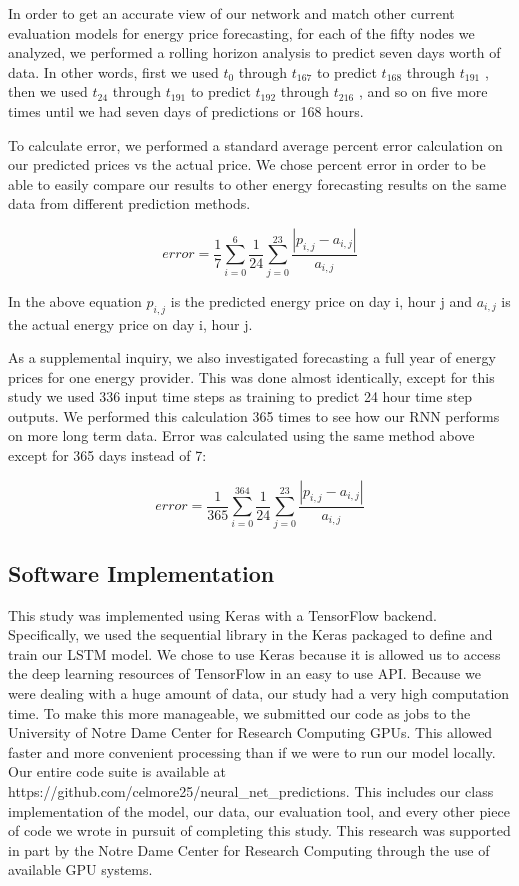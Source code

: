 \documentclass[sigconf]{acmart}
\begin{document}
In order to get an accurate view of our network and match other current evaluation models for energy price forecasting, for each of the fifty nodes we analyzed, we performed a rolling horizon analysis to predict seven days worth of data. In other words, first we used $t_{0}$ through $t_{167}$ to predict $t_{168}$ through $t_{191}$ , then we used $t_{24}$ through $t_{191}$ to predict $t_{192}$ through $t_{216}$ , and so on five more times until we had seven days of predictions or 168 hours.

To calculate error, we performed a standard average percent error calculation on our predicted prices vs the actual price. We chose percent error in order to be able to easily compare our results to other energy forecasting results on the same data from different prediction methods.

\begin{equation}
error = \frac{1}{7}\sum_{i=0}^{6}\frac{1}{24}\sum_{j=0}^{23}\frac{|p_{i,j}-a_{i,j}|}{a_{i,j}}
\end{equation}

In the above equation $p_{i,j}$ is the predicted energy price on day i, hour j and $a_{i,j}$ is the actual energy price on day i, hour j.

As a supplemental inquiry, we also investigated forecasting a full year of energy prices for one energy provider. This was done almost identically, except for this study we used 336 input time steps as training to predict 24 hour time step outputs. We performed this calculation 365 times to see how our RNN performs on more long term data. Error was calculated using the same method above except for 365 days instead of 7:

\begin{equation}
error = \frac{1}{365}\sum_{i=0}^{364}\frac{1}{24}\sum_{j=0}^{23}\frac{|p_{i,j}-a_{i,j}|}{a_{i,j}}
\end{equation}


\subsection{Software Implementation}
This study was implemented using Keras with a TensorFlow backend. Specifically, we used the sequential library in the Keras packaged to define and train our LSTM model. We chose to use Keras because it is allowed us to access the deep learning resources of TensorFlow in an easy to use API. Because we were dealing with a huge amount of data, our study had a very high computation time. To make this more manageable, we submitted our code as jobs to the University of Notre Dame Center for Research Computing GPUs. This allowed faster and more convenient processing than if we were to run our model locally. Our entire code suite  is available at https://github.com/celmore25/neural\_net\_predictions. This includes our class implementation of the model, our data, our evaluation tool, and every other piece of code we wrote in pursuit of completing this study. This research was supported in part by the Notre Dame Center for Research Computing through the use of available GPU systems. 
\end{document}
